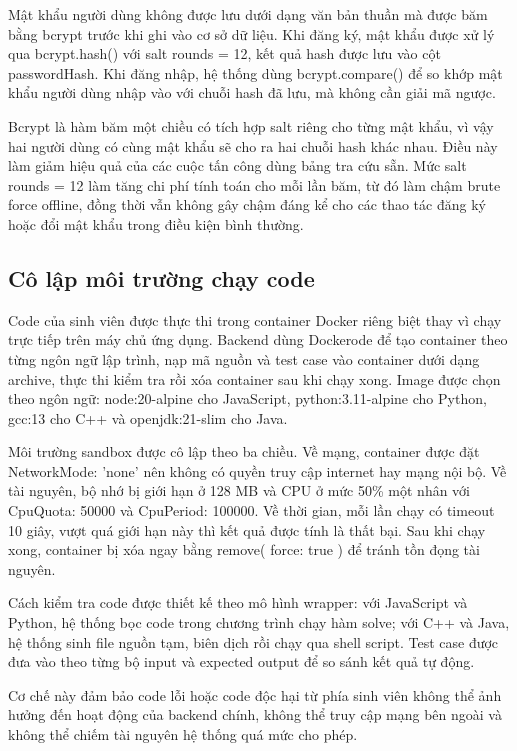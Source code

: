\documentclass[../main.tex]{subfiles}
\begin{document}
Mật khẩu người dùng không được lưu dưới dạng văn bản thuần mà được băm bằng bcrypt trước khi ghi vào cơ sở dữ liệu. Khi đăng ký, mật khẩu được xử lý qua bcrypt.hash() với salt rounds = 12, kết quả hash được lưu vào cột passwordHash. Khi đăng nhập, hệ thống dùng bcrypt.compare() để so khớp mật khẩu người dùng nhập vào với chuỗi hash đã lưu, mà không cần giải mã ngược.

Bcrypt là hàm băm một chiều có tích hợp salt riêng cho từng mật khẩu, vì vậy hai người dùng có cùng mật khẩu sẽ cho ra hai chuỗi hash khác nhau. Điều này làm giảm hiệu quả của các cuộc tấn công dùng bảng tra cứu sẵn. Mức salt rounds = 12 làm tăng chi phí tính toán cho mỗi lần băm, từ đó làm chậm brute force offline, đồng thời vẫn không gây chậm đáng kể cho các thao tác đăng ký hoặc đổi mật khẩu trong điều kiện bình thường.

\subsection{Cô lập môi trường chạy code}

Code của sinh viên được thực thi trong container Docker riêng biệt thay vì chạy trực tiếp trên máy chủ ứng dụng. Backend dùng Dockerode để tạo container theo từng ngôn ngữ lập trình, nạp mã nguồn và test case vào container dưới dạng archive, thực thi kiểm tra rồi xóa container sau khi chạy xong. Image được chọn theo ngôn ngữ: node:20-alpine cho JavaScript, python:3.11-alpine cho Python, gcc:13 cho C++ và openjdk:21-slim cho Java.

Môi trường sandbox được cô lập theo ba chiều. Về mạng, container được đặt NetworkMode: 'none' nên không có quyền truy cập internet hay mạng nội bộ. Về tài nguyên, bộ nhớ bị giới hạn ở 128 MB và CPU ở mức 50\% một nhân với CpuQuota: 50000 và CpuPeriod: 100000. Về thời gian, mỗi lần chạy có timeout 10 giây, vượt quá giới hạn này thì kết quả được tính là thất bại. Sau khi chạy xong, container bị xóa ngay bằng remove({ force: true }) để tránh tồn đọng tài nguyên.

Cách kiểm tra code được thiết kế theo mô hình wrapper: với JavaScript và Python, hệ thống bọc code trong chương trình chạy hàm solve; với C++ và Java, hệ thống sinh file nguồn tạm, biên dịch rồi chạy qua shell script. Test case được đưa vào theo từng bộ input và expected output để so sánh kết quả tự động.

Cơ chế này đảm bảo code lỗi hoặc code độc hại từ phía sinh viên không thể ảnh hưởng đến hoạt động của backend chính, không thể truy cập mạng bên ngoài và không thể chiếm tài nguyên hệ thống quá mức cho phép.
\end{document}
